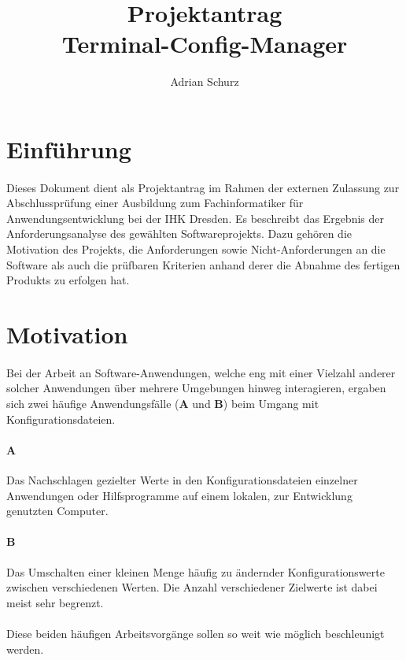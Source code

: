 \documentclass[a4paper,11pt]{article}
\author{Adrian Schurz}
\title{Projektantrag\\[0.2em]\smaller{}Terminal-Config-Manager}
\begin{document}
\maketitle
{}
\newpage
{}
\tableofcontents

\section{Einführung}
\paragraph{}
Dieses Dokument dient als Projektantrag im Rahmen der externen Zulassung
zur Abschlussprüfung einer Ausbildung zum Fachinformatiker für
Anwendungsentwicklung bei der IHK Dresden. Es beschreibt das Ergebnis der
Anforderungsanalyse des gewählten Softwareprojekts. Dazu gehören die
Motivation des Projekts, die Anforderungen sowie Nicht-Anforderungen an
die Software als auch die prüfbaren Kriterien anhand derer die Abnahme des
fertigen Produkts zu erfolgen hat.

\section{Motivation}
\paragraph{}
Bei der Arbeit an Software-Anwendungen, welche eng mit einer Vielzahl anderer
solcher Anwendungen über mehrere Umgebungen hinweg interagieren, ergaben sich
zwei häufige Anwendungsfälle (\textbf{A} und \textbf{B}) beim Umgang mit
Konfigurationsdateien.
\paragraph{A}
Das Nachschlagen gezielter Werte in den Konfigurationsdateien
einzelner Anwendungen oder Hilfsprogramme auf einem lokalen, zur Entwicklung
genutzten Computer.
\paragraph{B}
Das Umschalten einer kleinen Menge häufig zu ändernder Konfigurationswerte
zwischen verschiedenen Werten. Die Anzahl verschiedener Zielwerte ist dabei
meist sehr begrenzt.
\paragraph{}
Diese beiden häufigen Arbeitsvorgänge sollen so weit wie möglich beschleunigt
werden.
\end{document}
